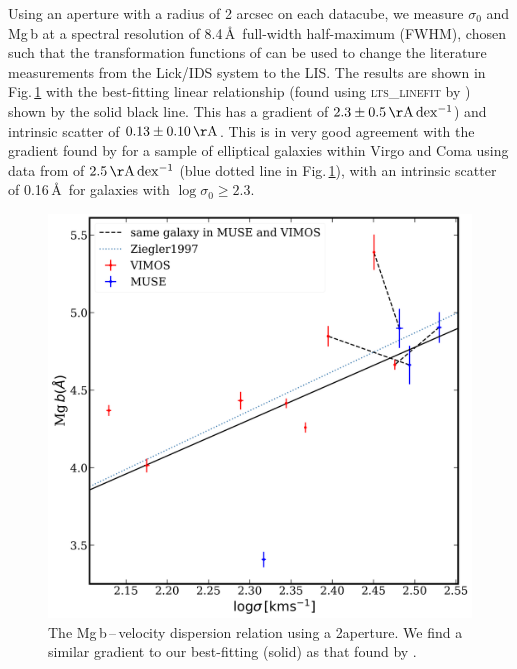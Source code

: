 \documentclass[a4paper,fleqn,usenatbib]{mnras}
\begin{document}
		Using an aperture with a radius of 2 arcsec on each datacube, we measure $\sigma_0$ and Mg\,b at a spectral resolution of 8.4\,\AA\ full-width half-maximum (FWHM), chosen such that the transformation functions of \citet{Vazdekis2010} can be used to change the literature measurements from the Lick/IDS system to the LIS. The results are shown in Fig.\,\ref{fig:globalMg} with the best-fitting linear relationship (found using \textsc{lts\_linefit} by \citealt{Cappellari2013}) shown by the solid black line. This has a gradient of $2.3 \pm 0.5 \,\mathrm{\AA\,dex^{-1}}$) and intrinsic scatter of $0.13 \pm 0.10 \, \mathrm{\AA}$. %
		This is in very good agreement with the gradient found by \citet{Ziegler1997} for a sample of elliptical galaxies within Virgo and Coma using data from \citet{Dressler1987} of $2.5\,\mathrm{\AA\,dex^{-1}}$ (blue dotted line in Fig.\,\ref{fig:globalMg}), with an intrinsic scatter of 0.16\,\AA\ for galaxies with $\log \sigma_0 \geqslant 2.3$. 

		\begin{figure}
			\includegraphics[width=\columnwidth]{Mg_sigma.png}
			\caption[Global Mg\,b\,--\,$\sigma$]{The Mg\,b\,--\,velocity dispersion relation using a 2\arcsec aperture. We find a similar gradient to our best-fitting (solid) as that found by \citet[; dotted line]{Ziegler1997}.}
			\label{fig:globalMg}
		\end{figure}
\end{document}
